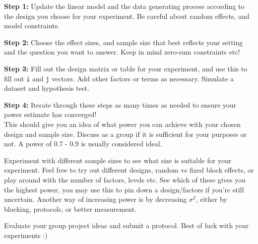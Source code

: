 \documentclass[
  letterpaper,
  DIV=11,
  numbers=noendperiod]{scrartcl}
\begin{document}
\textbf{Step 1:} Update the linear model and the data generating process
according to the design you choose for your experiment. Be careful about
random effects, and model constraints.

\textbf{Step 2:} Choose the effect sizes, and sample size that best
reflects your setting and the question you want to answer. Keep in mind
zero-sum constraints etc!

\textbf{Step 3:} Fill out the design matrix or table for your
experiment, and use this to fill out \texttt{i} and \texttt{j} vectors.
Add other factors or terms as necessary. Simulate a dataset and
hypothesis test.

\textbf{Step 4:} Iterate through these steps as many times as needed to
ensure your power estimate has converged!\\

This should give you an idea of what power you can achieve with your
chosen design and sample size. Discuss as a group if it is sufficient
for your purposes or not. A power of 0.7 - 0.9 is usually considered
ideal.

Experiment with different sample sizes to see what size is suitable for
your experiment. Feel free to try out different designs, random vs fixed
block effects, or play around with the number of factors, levels etc.
See which of these gives you the highest power, you may use this to pin
down a design/factors if you're still uncertain. Another way of
increasing power is by decreasing \(\sigma^2\), either by blocking,
protocols, or better measurement.

Evaluate your group project ideas and submit a protocol. Best of luck
with your experiments :)
\end{document}

